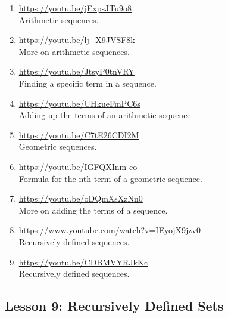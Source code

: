\documentclass[11pt]{amsart}
\begin{document}
\begin{enumerate}

\item \url{https://youtu.be/jExpsJTu9o8}\\
Arithmetic sequences.\\[5pt]


\item \url{https://youtu.be/lj_X9JVSF8k}\\
More on arithmetic sequences.\\[5pt]



\item \url{https://youtu.be/JtsyP0tnVRY}\\
Finding a specific term in a sequence.\\[5pt]



\item \url{https://youtu.be/UHkueFmPC6s}\\
Adding up the terms of an arithmetic sequence.\\[5pt]



\item \url{https://youtu.be/C7tE26CDI2M}\\
Geometric sequences.\\[5pt]



\item \url{https://youtu.be/IGFQXInm-co}\\
Formula for the nth term of a geometric sequence.\\[5pt]


\item \url{https://youtu.be/oDQmXsXzNn0}\\
More on adding the terms of a sequence.\\[5pt]

\item \url{https://www.youtube.com/watch?v=IEyojX9jzv0}\\
Recursively defined sequences.\\[5pt]


\item \url{https://youtu.be/CDBMVYRJkKc}\\
Recursively defined sequences.\\[5pt]


\end{enumerate}

\subsection{Lesson 9: Recursively Defined Sets}
\end{document}
